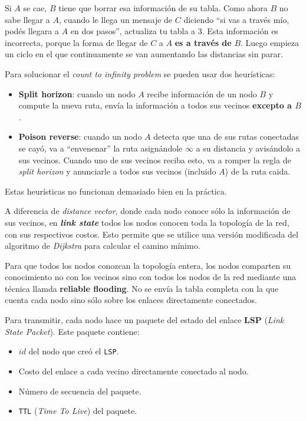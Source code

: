 \documentclass[]{article}
\begin{document}

Si $A$ se cae, $B$ tiene que borrar esa información de su tabla. Como ahora $B$ no sabe llegar a $A$, cuando le llega un mensaje de $C$ diciendo ``si vas a través mío, podés llegara a $A$ en dos pasos'', actualiza tu tabla a 3. Esta información es incorrecta, porque la forma de llegar de $C$ a $A$ \textbf{es a través de} $B$. Luego empieza un ciclo en el que continuamente se van aumentando las distancias sin parar.

Para solucionar el \emph{count to infinity problem} se pueden usar dos heurísticas:
\begin{itemize}
     \item \textbf{Split horizon}: cuando un nodo $A$ recibe información de un nodo $B$ y compute la nueva ruta, envía la información a todos sus vecinos \textbf{excepto a $B$}.
     \item \textbf{Poison reverse}: cuando un nodo $A$ detecta que una de sus rutas conectadas se cayó, va a ``envenenar'' la ruta asignándole $\infty$ a su distancia y avisándolo a sus vecinos. Cuando uno de sus vecinos reciba esto, va a romper la regla de \emph{split horizon} y anunciarle a todos sus vecinos (incluido $A$) de la ruta caida.
 \end{itemize}

 Estas heurísticas no funcionan demasiado bien en la práctica.

A diferencia de \emph{distance vector}, donde cada nodo conoce sólo la información de sus vecinos, en \textbf{\emph{link state}} todos los nodos conocen toda la topología de la red, con sus respectivos costos. Esto permite que se utilice una versión modificada del algoritmo de \emph{Dijkstra} para calcular el camino mínimo.

Para que todos los nodos conozcan la topología entera, los nodos comparten su conocimiento no con los vecinos sino con todos los nodos de la red mediante una técnica llamda \textbf{reliable flooding}. No se envía la tabla completa con la que cuenta cada nodo sino sólo sobre los enlaces directamente conectados.

Para transmitir, cada nodo hace un paquete del estado del enlace \textbf{LSP} (\emph{Link State Packet}). Este paquete contiene:
\begin{itemize}
    \item $id$ del nodo que creó el \texttt{LSP}.
    \item Costo del enlace a cada vecino directamente conectado al nodo.
    \item Número de secuencia del paquete.
    \item \texttt{TTL} (\emph{Time To Live}) del paquete.
\end{itemize}
\end{document}
